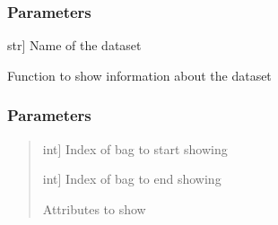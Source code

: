 \documentclass[letterpaper,10pt,english]{sphinxmanual}
\begin{document}
\begin{fulllineitems}
\begin{fulllineitems}
\subsubsection{Parameters}
\label{\detokenize{data/_autosummary/miml.data.miml_dataset.MIMLDataset:id34}}\begin{description}
\sphinxlineitem{name}{[}str{]}
\sphinxAtStartPar
Name of the dataset

\end{description}

\end{fulllineitems}


\begin{fulllineitems}
\label{\detokenize{data/_autosummary/miml.data.miml_dataset.MIMLDataset:miml.data.miml_dataset.MIMLDataset.show_dataset}}
\pysigstartsignatures
{}
\pysigstopsignatures
\sphinxAtStartPar
Function to show information about the dataset


\subsubsection{Parameters}
\label{\detokenize{data/_autosummary/miml.data.miml_dataset.MIMLDataset:id35}}\begin{quote}
\begin{description}
\sphinxlineitem{start}{[}int{]}
\sphinxAtStartPar
Index of bag to start showing

\sphinxlineitem{end}{[}int{]}
\sphinxAtStartPar
Index of bag to end showing

\sphinxAtStartPar
Attributes to show


\end{description}
\end{quote}
\end{fulllineitems}
\end{fulllineitems}
\end{document}
